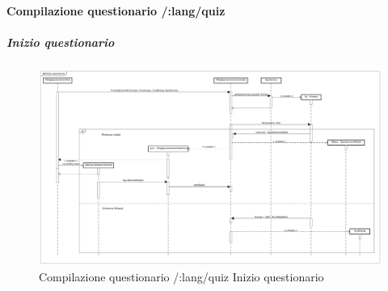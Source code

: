 \paragraph{Compilazione questionario /:lang/quiz}

\subparagraph{Inizio questionario}

\label{Compilazione questionario /:lang/quiz/:idQuiz Inizio questionario}

\begin{figure}[ht]
	\centering
	\includegraphics[scale=0.25,keepaspectratio]{UML/DiagrammiDiSequenza/Front-End/Quiz_start.png}
	\caption{Compilazione questionario /:lang/quiz Inizio questionario}
\end{figure} \FloatBarrier


